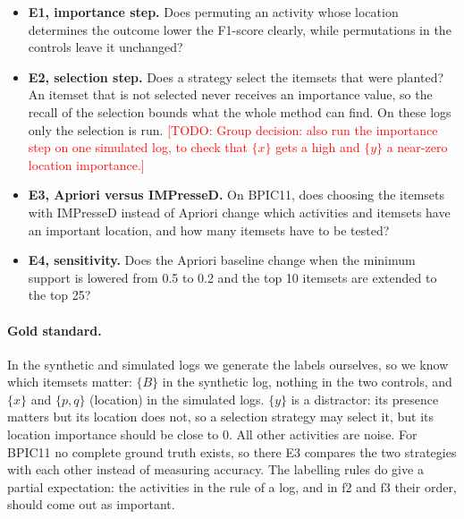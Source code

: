 \documentclass{article}
\newcommand{\todo}[1]{\textcolor{red}{[TODO: #1]}}
\begin{document}
\begin{itemize}
    \item \textbf{E1, importance step.} Does permuting an activity whose location determines the outcome lower the F1-score clearly, while permutations in the controls leave it unchanged?
    \item \textbf{E2, selection step.} Does a strategy select the itemsets that were planted? An itemset that is not selected never receives an importance value, so the recall of the selection bounds what the whole method can find. On these logs only the selection is run. \todo{Group decision: also run the importance step on one simulated log, to check that $\{x\}$ gets a high and $\{y\}$ a near-zero location importance.}
    \item \textbf{E3, Apriori versus IMPresseD.} On BPIC11, does choosing the itemsets with IMPresseD instead of Apriori change which activities and itemsets have an important location, and how many itemsets have to be tested?
    \item \textbf{E4, sensitivity.} Does the Apriori baseline change when the minimum support is lowered from 0.5 to 0.2 and the top 10 itemsets are extended to the top 25?
\end{itemize}

\paragraph{Gold standard.} In the synthetic and simulated logs we generate the labels ourselves, so we know which itemsets matter: $\{B\}$ in the synthetic log, nothing in the two controls, and $\{x\}$ and $\{p,q\}$ (location) in the simulated logs. $\{y\}$ is a distractor: its presence matters but its location does not, so a selection strategy may select it, but its location importance should be close to 0. All other activities are noise. For BPIC11 no complete ground truth exists, so there E3 compares the two strategies with each other instead of measuring accuracy. The labelling rules do give a partial expectation: the activities in the rule of a log, and in f2 and f3 their order, should come out as important.
\end{document}
